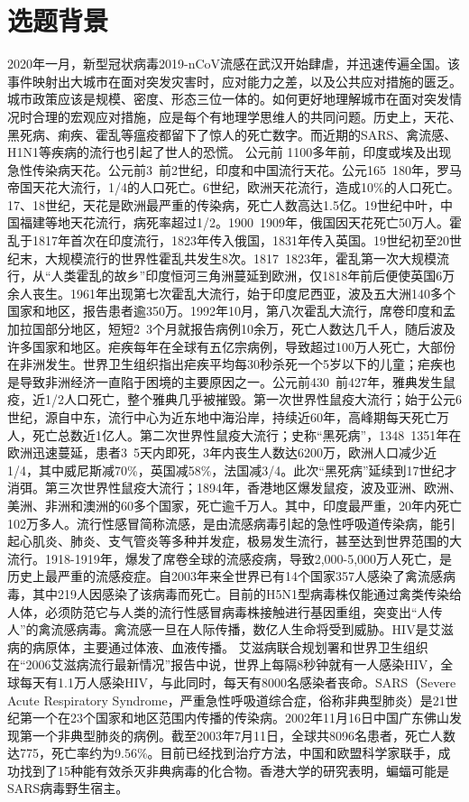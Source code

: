 \chapter{选题背景}

2020年一月，新型冠状病毒2019-nCoV流感在武汉开始肆虐，并迅速传遍全国。该事件映射出大城市在面对突发灾害时，应对能力之差，以及公共应对措施的匮乏。城市政策应该是规模、密度、形态三位一体的\cite{xiu_2003}。如何更好地理解城市在面对突发情况时合理的宏观应对措施，应是每个有地理学思维人的共同问题。历史上，天花、黑死病、痢疾、霍乱等瘟疫都留下了惊人的死亡数字。而近期的SARS、禽流感、H1N1等疾病的流行也引起了世人的恐慌。 公元前 1100多年前，印度或埃及出现急性传染病天花。公元前3~前2世纪，印度和中国流行天花。公元165~180年，罗马帝国天花大流行，1/4的人口死亡。6世纪，欧洲天花流行，造成10\%的人口死亡。17、18世纪，天花是欧洲最严重的传染病，死亡人数高达1.5亿。19世纪中叶，中国福建等地天花流行，病死率超过1/2。1900~1909年，俄国因天花死亡50万人。霍乱于1817年首次在印度流行，1823年传入俄国，1831年传入英国。19世纪初至20世纪末，大规模流行的世界性霍乱共发生8次。1817~1823年，霍乱第一次大规模流行，从“人类霍乱的故乡”印度恒河三角洲蔓延到欧洲，仅1818年前后便使英国6万余人丧生。1961年出现第七次霍乱大流行，始于印度尼西亚，波及五大洲140多个国家和地区，报告患者逾350万。1992年10月，第八次霍乱大流行，席卷印度和孟加拉国部分地区，短短2~3个月就报告病例10余万，死亡人数达几千人，随后波及许多国家和地区。疟疾每年在全球有五亿宗病例，导致超过100万人死亡，大部份在非洲发生。世界卫生组织指出疟疾平均每30秒杀死一个5岁以下的儿童；疟疾也是导致非洲经济一直陷于困境的主要原因之一。公元前430~前427年，雅典发生鼠疫，近1/2人口死亡，整个雅典几乎被摧毁。第一次世界性鼠疫大流行；始于公元6世纪，源自中东，流行中心为近东地中海沿岸，持续近60年，高峰期每天死亡万人，死亡总数近1亿人。第二次世界性鼠疫大流行；史称“黑死病”，1348~1351年在欧洲迅速蔓延，患者3~5天内即死，3年内丧生人数达6200万，欧洲人口减少近1/4，其中威尼斯减70\%，英国减58\%，法国减3/4。此次“黑死病”延续到17世纪才消弭。第三次世界性鼠疫大流行；1894年，香港地区爆发鼠疫，波及亚洲、欧洲、美洲、非洲和澳洲的60多个国家，死亡逾千万人。其中，印度最严重，20年内死亡102万多人。流行性感冒简称流感，是由流感病毒引起的急性呼吸道传染病，能引起心肌炎、肺炎、支气管炎等多种并发症，极易发生流行，甚至达到世界范围的大流行。1918-1919年，爆发了席卷全球的流感疫病，导致2,000-5,000万人死亡，是历史上最严重的流感疫症。自2003年来全世界已有14个国家357人感染了禽流感病毒，其中219人因感染了该病毒而死亡。目前的H5N1型病毒株仅能通过禽类传染给人体，必须防范它与人类的流行性感冒病毒株接触进行基因重组，突变出“人传人”的禽流感病毒。禽流感一旦在人际传播，数亿人生命将受到威胁。HIV是艾滋病的病原体，主要通过体液、血液传播。 艾滋病联合规划署和世界卫生组织在“2006艾滋病流行最新情况”报告中说，世界上每隔8秒钟就有一人感染HIV，全球每天有1.1万人感染HIV，与此同时，每天有8000名感染者丧命。SARS（Severe Acute Respiratory Syndrome，严重急性呼吸道综合症，俗称非典型肺炎）是21世纪第一个在23个国家和地区范围内传播的传染病。2002年11月16日中国广东佛山发现第一个非典型肺炎的病例。截至2003年7月11日，全球共8096名患者，死亡人数达775，死亡率约为9.56\%。目前已经找到治疗方法，中国和欧盟科学家联手，成功找到了15种能有效杀灭非典病毒的化合物。香港大学的研究表明，蝙蝠可能是SARS病毒野生宿主。

